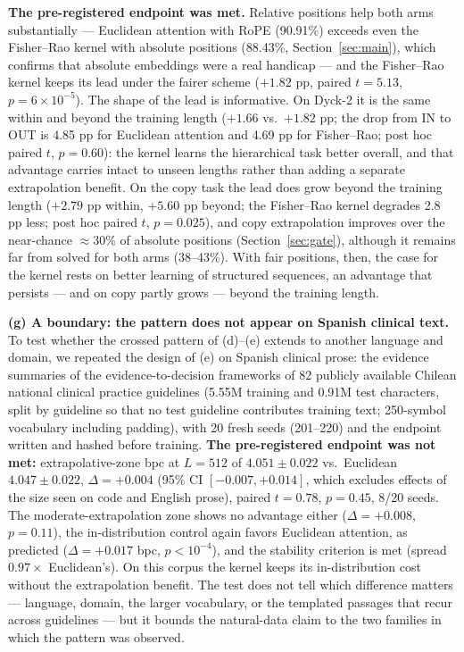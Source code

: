 \documentclass[11pt]{article}
\begin{document}
\textbf{The pre-registered endpoint was met.} Relative positions help both arms substantially --- Euclidean attention with RoPE (90.91\%) exceeds even the Fisher--Rao kernel with absolute positions (88.43\%, Section~\ref{sec:main}), which confirms that absolute embeddings were a real handicap --- and the Fisher--Rao kernel keeps its lead under the fairer scheme ($+1.82$ pp, paired $t = 5.13$, $p = 6\times10^{-5}$). The shape of the lead is informative. On Dyck-2 it is the same within and beyond the training length ($+1.66$ vs.\ $+1.82$ pp; the drop from IN to OUT is 4.85 pp for Euclidean attention and 4.69 pp for Fisher--Rao; post hoc paired $t$, $p = 0.60$): the kernel learns the hierarchical task better overall, and that advantage carries intact to unseen lengths rather than adding a separate extrapolation benefit. On the copy task the lead does grow beyond the training length ($+2.79$ pp within, $+5.60$ pp beyond; the Fisher--Rao kernel degrades 2.8 pp less; post hoc paired $t$, $p = 0.025$), and copy extrapolation improves over the near-chance $\approx$30\% of absolute positions (Section~\ref{sec:gate}), although it remains far from solved for both arms (38--43\%). With fair positions, then, the case for the kernel rests on better learning of structured sequences, an advantage that persists --- and on copy partly grows --- beyond the training length.

\textbf{(g) A boundary: the pattern does not appear on Spanish clinical text.} To test whether the crossed pattern of (d)--(e) extends to another language and domain, we repeated the design of (e) on Spanish clinical prose: the evidence summaries of the evidence-to-decision frameworks of 82 publicly available Chilean national clinical practice guidelines (5.55M training and 0.91M test characters, split by guideline so that no test guideline contributes training text; 250-symbol vocabulary including padding), with 20 fresh seeds (201--220) and the endpoint written and hashed before training. \textbf{The pre-registered endpoint was not met:} extrapolative-zone bpc at $L{=}512$ of $4.051 \pm 0.022$ vs.\ Euclidean $4.047 \pm 0.022$, $\Delta = +0.004$ (95\% CI $[-0.007, +0.014]$, which excludes effects of the size seen on code and English prose), paired $t = 0.78$, $p = 0.45$, 8/20 seeds. The moderate-extrapolation zone shows no advantage either ($\Delta = +0.008$, $p = 0.11$), the in-distribution control again favors Euclidean attention, as predicted ($\Delta = +0.017$ bpc, $p < 10^{-4}$), and the stability criterion is met (spread $0.97\times$ Euclidean's). On this corpus the kernel keeps its in-distribution cost without the extrapolation benefit. The test does not tell which difference matters --- language, domain, the larger vocabulary, or the templated passages that recur across guidelines --- but it bounds the natural-data claim to the two families in which the pattern was observed.
\end{document}
